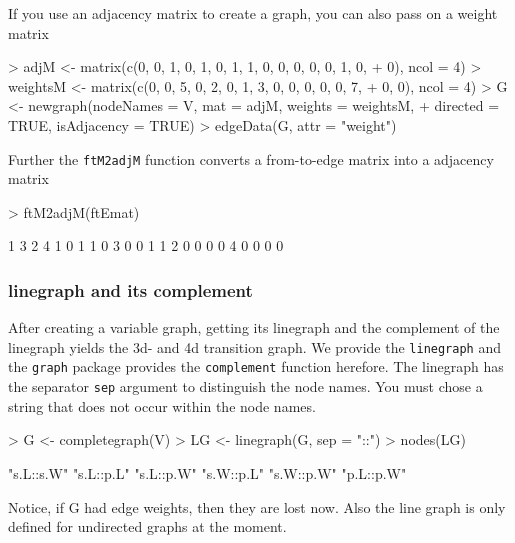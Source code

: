 \documentclass[12pt,oneside,titlepage,letter]{article}
\newcommand{\modify}[1]{{\color{blue}#1}}
\begin{document}
If you use an adjacency matrix to create a graph, you can also pass on a weight matrix
\begin{Schunk}
\begin{Sinput}
> adjM <- matrix(c(0, 0, 1, 0, 1, 0, 1, 1, 0, 0, 0, 0, 0, 1, 0, 
+     0), ncol = 4)
> weightsM <- matrix(c(0, 0, 5, 0, 2, 0, 1, 3, 0, 0, 0, 0, 0, 7, 
+     0, 0), ncol = 4)
> G <- newgraph(nodeNames = V, mat = adjM, weights = weightsM, 
+     directed = TRUE, isAdjacency = TRUE)
> edgeData(G, attr = "weight")
\end{Sinput}
\end{Schunk}
Further the \texttt{ftM2adjM} function converts a from-to-edge matrix into a adjacency matrix
\begin{Schunk}
\begin{Sinput}
> ftM2adjM(ftEmat)
\end{Sinput}
\begin{Soutput}
  1 3 2 4
1 0 1 1 0
3 0 0 1 1
2 0 0 0 0
4 0 0 0 0
\end{Soutput}
\end{Schunk}

\subsubsection{linegraph and its complement}
After creating a variable graph, getting its linegraph and the complement of the linegraph yields the 3d- and 4d transition graph. We provide the \texttt{linegraph} and the \texttt{graph} package provides the \texttt{complement} function herefore. The linegraph has the separator \texttt{sep} argument to distinguish the node names. You must chose a string that does not occur within the node names.

\begin{Schunk}
\begin{Sinput}
> G <- completegraph(V)
> LG <- linegraph(G, sep = "::")
> nodes(LG)
\end{Sinput}
\begin{Soutput}
[1] "s.L::s.W" "s.L::p.L" "s.L::p.W" "s.W::p.L" "s.W::p.W" "p.L::p.W"
\end{Soutput}
\end{Schunk}
\modify{Notice, if G had edge weights, then they are lost now. Also the line graph is only defined for undirected graphs at the moment.}
\end{document}
